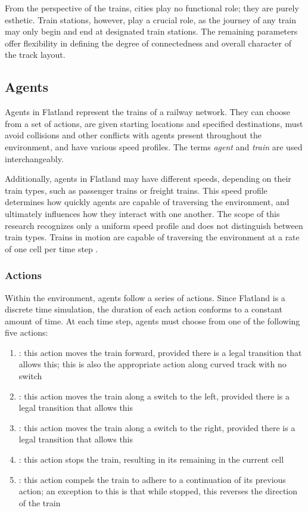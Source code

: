 \documentclass[11pt]{article}
\begin{document}
\noindent From the perspective of the trains, cities play no functional role; they are purely esthetic. Train stations, however, play a crucial role, as the journey of any train may only begin and end at designated train stations.  The remaining parameters offer flexibility in defining the degree of connectedness and overall character of the track layout. \medskip


\subsection{Agents}
\label{sec:Agents}
Agents in Flatland represent the trains of a railway network.  They can choose from a set of actions, are given starting locations and specified destinations, must avoid collisions and other conflicts with agents present throughout the environment, and have various speed profiles.  The terms \textit{agent} and \textit{train} are used interchangeably.

Additionally, agents in Flatland may have different speeds, depending on their train types, such as passenger trains or freight trains.  This speed profile determines how quickly agents are capable of traversing the environment, and ultimately influences how they interact with one another.  The scope of this research recognizes only a uniform speed profile and does not distinguish between train types.  Trains in motion are capable of traversing the environment at a rate of one cell per time step \citep{baeiegljmomonyspwaaggo21a}.

\subsubsection{Actions}
\label{sec:Actions}
Within the environment, agents follow a series of actions.  Since Flatland is a discrete time simulation, the duration of each action conforms to a constant amount of time.    At each time step, agents must choose from one of the following five actions: 
\begin{enumerate}
  \item {}: this action moves the train forward, provided there is a legal transition that allows this; this is also the appropriate action along curved track with no switch
  \item {}: this action moves the train along a switch to the left, provided there is a legal transition that allows this
  \item {}: this action moves the train along a switch to the right, provided there is a legal transition that allows this
  \item {}: this action stops the train, resulting in its remaining in the current cell
  \item {}: this action compels the train to adhere to a continuation of its previous action; an exception to this is that while stopped, this reverses the direction of the train
\end{enumerate} \smallskip
\end{document}
